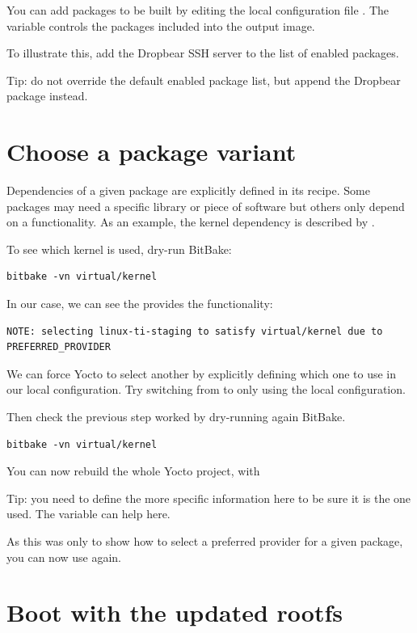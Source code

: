You can add packages to be built by editing the local configuration file
. The  variable controls the
packages included into the output image.

To illustrate this, add the Dropbear SSH server to the list of enabled
packages.

Tip: do not override the default enabled package list, but append the Dropbear
package instead.

\section{Choose a package variant}

Dependencies of a given package are explicitly defined in its recipe.
Some packages may need a specific library or piece of software but
others only depend on a functionality. As an example, the kernel
dependency is described by .

To see which kernel is used, dry-run BitBake:
\begin{verbatim}
bitbake -vn virtual/kernel
\end{verbatim}

In our case, we can see the  provides the
 functionality:
\small
\begin{verbatim}
NOTE: selecting linux-ti-staging to satisfy virtual/kernel due to PREFERRED_PROVIDER
\end{verbatim}
\normalsize

We can force Yocto to select another  by explicitly
defining which one to use in our local configuration. Try switching
from  to  only using the
local configuration.

Then check the previous step worked by dry-running again BitBake.
\begin{verbatim}
bitbake -vn virtual/kernel
\end{verbatim}

You can now rebuild the whole Yocto project, with 

Tip: you need to define the more specific information here to be sure it is the
one used. The  variable can help here.

As this was only to show how to select a preferred provider for a
given package, you can now use  again.

\section{Boot with the updated rootfs}

